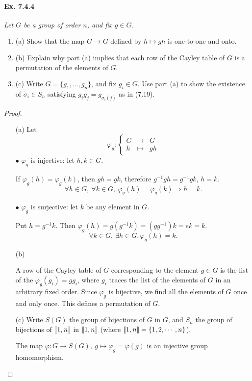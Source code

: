 \documentclass[11pt,a4paper]{article}
\def\gcro{\mbox{[\hspace{-.15em}[}}%
\def\dcro{\mbox{]\hspace{-.15em}]}}
\newcommand{\be} {\begin{enumerate}}
\newcommand{\ee} {\end{enumerate}}
\begin{document}
\paragraph{Ex. 7.4.4}

{\it Let $G$ be a group of order $n$, and fix $g\in G$.
\be
\item[(a)] Show that the map $G\to G$ defined by $h\mapsto gh$ is one-to-one and onto.
\item[(b)] Explain why part (a) implies that each row of the Cayley table of $G$ is a permutation of the elements of $G$.
\item[(c)] Write $G = \{g_1,\ldots,g_n\}$, and fix $g_i \in G$. Use part (a) to show the existence of $\sigma_i \in S_n$ satisfying $g_ig_j = g_{\sigma_i(j)}$ as in (7.19).
\ee
}

\begin{proof}
\begin{enumerate}
\item[(a)]
Let 
$$
\varphi_g : 
\left\{
\begin{array}{ccc}
  G & \to  & G   \\
  h & \mapsto  &   gh  
\end{array}
\right.
$$
$\bullet$ $\varphi_g$ is injective: let $h,k \in G$.

If $\varphi_g(h) = \varphi_g(k)$, then $gh = gk$, therefore $g^{-1} gh = g^{-1} gk$, $h=k$.
$$\forall h \in G,\ \forall k \in G, \ \varphi_g(h) = \varphi_g(k) \Rightarrow h=k.$$

$\bullet$ $\varphi_g$ is surjective: let $k$ be any element in $G$.

Put $h = g^{-1}k$. Then $\varphi_g(h) = g(g^{-1}k) = (g g^{-1}) k = ek =  k$.
$$\forall k \in G, \ \exists h \in G, \varphi_g(h) = k.$$

\item[(b)]

A row of the Cayley table of  $G$ corresponding to the element $g\in G$ is the list of the $\varphi_g(g_i) = gg_i$, where $g_i$ traces the list of the elements of $G$ in an arbitrary fixed order. Since $\varphi_g$ is bijective, we find all the elements of $G$ once and only once. This defines a permutation of $G$.

\item[(c)]
Write $S(G)$ the group of bijections of $G$ in $G$, and $S_n$ the group of bijections of $\gcro 1,n \dcro$ in $\gcro 1,n \dcro$ (where $\gcro 1,n \dcro = \{1,2,\cdots,n\}$).

The map $\varphi : G\to S(G),\  g\mapsto \varphi_g = \varphi(g)$ is an injective group homomorphism.


\end{enumerate}
\end{proof}
\end{document}
